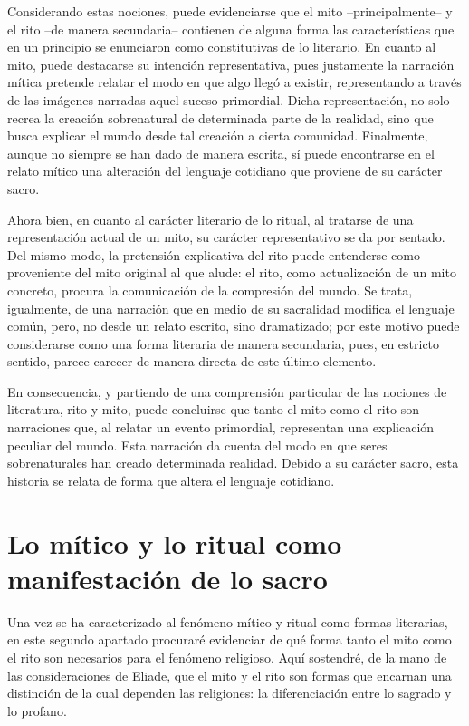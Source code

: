\begin{refsection}
Considerando estas nociones, puede evidenciarse que el mito --principalmente-- y el rito --de manera secundaria-- contienen de alguna forma las características que en un principio se enunciaron como constitutivas de lo literario. En cuanto al mito, puede destacarse su intención representativa, pues justamente la narración mítica pretende relatar el modo en que algo llegó a existir, representando a través de las imágenes narradas aquel suceso primordial. Dicha representación, no solo recrea la creación sobrenatural de determinada parte de la realidad, sino que busca explicar el mundo desde tal creación a cierta comunidad. Finalmente, aunque no siempre se han dado de manera escrita, sí puede encontrarse en el relato mítico una alteración del lenguaje cotidiano que proviene de su carácter sacro.

Ahora bien, en cuanto al carácter literario de lo ritual, al tratarse de una representación actual de un mito, su carácter representativo se da por sentado. Del mismo modo, la pretensión explicativa del rito puede entenderse como proveniente del mito original al que alude: el rito, como actualización de un mito concreto, procura la comunicación de la compresión del mundo. Se trata, igualmente, de una narración que en medio de su sacralidad modifica el lenguaje común, pero, no desde un relato escrito, sino dramatizado; por este motivo puede considerarse como una forma literaria de manera secundaria, pues, en estricto sentido, parece carecer de manera directa de este último elemento.

En consecuencia, y partiendo de una comprensión particular de las nociones de literatura, rito y mito, puede concluirse que tanto el mito como el rito son narraciones que, al relatar un evento primordial, representan una explicación peculiar del mundo. Esta narración da cuenta del modo en que seres sobrenaturales han creado determinada realidad. Debido a su carácter sacro, esta historia se relata de forma que altera el lenguaje cotidiano.

\section{Lo mítico y lo ritual como manifestación de lo sacro }

Una vez se ha caracterizado al fenómeno mítico y ritual como formas literarias, en este segundo apartado procuraré evidenciar de qué forma tanto el mito como el rito son necesarios para el fenómeno religioso. Aquí sostendré, de la mano de las consideraciones de Eliade, que el mito y el rito son formas que encarnan una distinción de la cual dependen las religiones: la diferenciación entre lo sagrado y lo profano.


\end{refsection}
